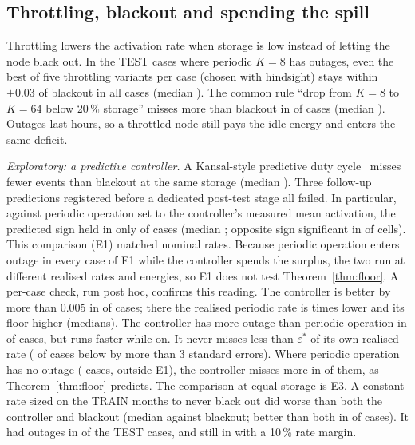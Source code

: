 \documentclass[lettersize,journal]{IEEEtran}
\theoremstyle{definition}
\theoremstyle{remark}
\newcommand{\eps}{\varepsilon}
\begin{document}
\subsection{Throttling, blackout and spending the spill}\label{sec:throttle}
Throttling lowers the activation rate when storage is low instead of letting the node black out. In the \nThr{} TEST cases where periodic $K=8$ has outages, even the best of five throttling variants per case (chosen with hindsight) stays within $\pm0.03$ of blackout in all cases (median \thrMedSigned). The common rule ``drop from $K=8$ to $K=64$ below 20\,\% storage'' misses more than blackout in \naiveSharePct{} of cases (median \naiveMedSigned). Outages last hours, so a throttled node still pays the idle energy and enters the same deficit.

\emph{Exploratory: a predictive controller.} A Kansal-style predictive duty cycle~\cite{kansal2007} misses fewer events than blackout at the same storage (median \ExKblk). Three follow-up predictions registered before a dedicated post-test stage all failed. In particular, against periodic operation set to the controller's measured mean activation, the predicted sign held in only \ExOneShare{} of cases (median \ExOneMed; opposite sign significant in \ExOneWrong{} of \ExOneN{} cells). This comparison (E1) matched nominal rates. Because periodic operation enters outage in every case of E1 while the controller spends the surplus, the two run at different realised rates and energies, so E1 does not test Theorem~\ref{thm:floor}. A per-case check, run post hoc, confirms this reading. The controller is better by more than 0.005 in \KcNwin{} of \KcNcases{} cases; there the realised periodic rate is \KcRateRatio{} times lower and its floor \KcGapMed{} higher (medians). The controller has more outage than periodic operation in \KcKmoreOutPct{} of cases, but runs faster while on. It never misses less than $\eps^*$ of its own realised rate (\KcKoneFail{} of \KcNall{} cases below by more than 3 standard errors). Where periodic operation has no outage (\KcNnoOut{} cases, outside E1), the controller misses more in \KcNoOutLosePct{} of them, as Theorem~\ref{thm:floor} predicts. The comparison at equal storage is E3. A constant rate sized on the TRAIN months to never black out did worse than both the controller and blackout (median \ExThreeBlk{} against blackout; better than both in \ExThreeBoth{} of cases). It had outages in \ExThreeOutZero{} of the TEST cases, and still in \ExThreeOutTen{} with a 10\,\% rate margin.
\end{document}
